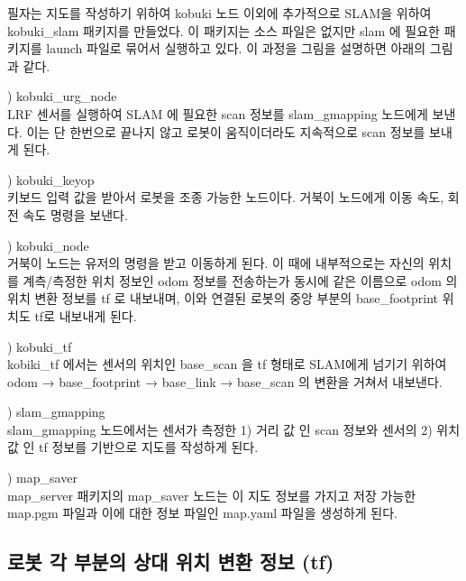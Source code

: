 필자는 지도를 작성하기 위하여 kobuki 노드 이외에 추가적으로 SLAM을 위하여 kobuki\_slam 패키지를 만들었다. 이 패키지는 소스 파일은 없지만 slam 에 필요한 패키지를 launch 파일로 묶어서 실행하고 있다. 이 과정을 그림을 설명하면 아래의 그림과 같다.  

\setcounter{num}{0}

\vspace{\baselineskip}
\noindent
{}
\thenum) kobuki\_urg\_node\\
LRF 센서를 실행하여 SLAM 에 필요한 scan 정보를 slam\_gmapping 노드에게 보낸다. 이는 단 한번으로 끝나지 않고 로봇이 움직이더라도 지속적으로 scan 정보를 보내게 된다.

\vspace{\baselineskip}
\noindent
{}
\thenum) kobuki\_keyop\\
키보드 입력 값을 받아서 로봇을 조종 가능한 노드이다. 거북이 노드에게 이동 속도, 회전 속도 명령을 보낸다.

\vspace{\baselineskip}
\noindent
{}
\thenum) kobuki\_node\\
거북이 노드는 유저의 명령을 받고 이동하게 된다. 이 때에 내부적으로는 자신의 위치를 계측/측정한 위치 정보인 odom 정보를 전송하는가 동시에 같은 이름으로 odom 의 위치 변환 정보를 tf 로 내보내며, 이와 연결된 로봇의 중앙 부분의 base\_footprint 위치도 tf로 내보내게 된다.

\vspace{\baselineskip}
\noindent
{}
\thenum) kobuki\_tf\\
kobiki\_tf 에서는 센서의 위치인 base\_scan 을 tf 형태로 SLAM에게 넘기기 위하여 odom → base\_footprint → base\_link → base\_scan 의 변환을 거쳐서 내보낸다.

\vspace{\baselineskip}
\noindent
{}
\thenum) slam\_gmapping\\
slam\_gmapping 노드에서는 센서가 측정한 1) 거리 값 인 scan 정보와 센서의 2) 위치 값 인 tf 정보를 기반으로 지도를 작성하게 된다. 

\vspace{\baselineskip}
\noindent
{}
\thenum) map\_saver\\
map\_server 패키지의 map\_saver 노드는 이 지도 정보를 가지고 저장 가능한 map.pgm 파일과 이에 대한 정보 파일인 map.yaml 파일을 생성하게 된다.

\subsection{로봇 각 부분의 상대 위치 변환 정보 (tf)}

